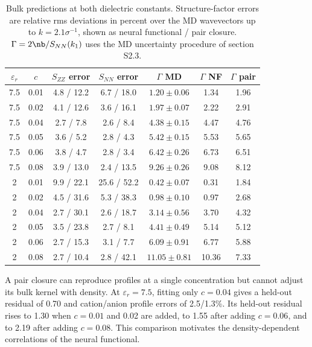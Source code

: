 \begin{table}[H]
\centering
\caption{Bulk predictions at both dielectric constants. Structure-factor errors are relative rms deviations in percent over the MD wavevectors up to $k=2.1\sigma^{-1}$, shown as neural functional / pair closure. $\Gamma=2\nb/S_{NN}(k_1)$ uses the MD uncertainty procedure of section S2.3.}
\label{tab:S:sk}
\begin{tabular}{c c c c c c c}
$\varepsilon_r$ & $c$ & $S_{ZZ}$ error & $S_{NN}$ error & $\Gamma$ MD & $\Gamma$ NF & $\Gamma$ pair\\
\midrule
7.5 & 0.01 & 4.8 / 12.2 & 6.7 / 18.0 & $1.20\pm0.06$ & 1.34 & 1.96\\
7.5 & 0.02 & 4.1 / 12.6 & 3.6 / 16.1 & $1.97\pm0.07$ & 2.22 & 2.91\\
7.5 & 0.04 & 2.7 / 7.8 & 2.6 / 8.4 & $4.38\pm0.15$ & 4.47 & 4.76\\
7.5 & 0.05 & 3.6 / 5.2 & 2.8 / 4.3 & $5.42\pm0.15$ & 5.53 & 5.65\\
7.5 & 0.06 & 3.8 / 4.7 & 2.8 / 3.4 & $6.42\pm0.26$ & 6.73 & 6.51\\
7.5 & 0.08 & 3.9 / 13.0 & 2.4 / 13.5 & $9.26\pm0.26$ & 9.08 & 8.12\\
2 & 0.01 & 9.9 / 22.1 & 25.6 / 52.2 & $0.42\pm0.07$ & 0.31 & 1.84\\
2 & 0.02 & 4.5 / 31.6 & 5.3 / 38.3 & $0.98\pm0.10$ & 0.97 & 2.68\\
2 & 0.04 & 2.7 / 30.1 & 2.6 / 18.7 & $3.14\pm0.56$ & 3.70 & 4.32\\
2 & 0.05 & 3.5 / 23.8 & 2.7 / 8.1 & $4.41\pm0.49$ & 5.14 & 5.12\\
2 & 0.06 & 2.7 / 15.3 & 3.1 / 7.7 & $6.09\pm0.91$ & 6.77 & 5.88\\
2 & 0.08 & 2.7 / 10.4 & 2.8 / 42.1 & $11.05\pm0.81$ & 10.36 & 7.33\\
\bottomrule
\end{tabular}
\end{table}


A pair closure can reproduce profiles at a single concentration but cannot adjust its bulk kernel with density. At $\varepsilon_r=7.5$, fitting only $c=0.04$ gives a held-out residual of 0.70 and cation/anion profile errors of 2.5/1.3\%. Its held-out residual rises to 1.30 when $c=0.01$ and 0.02 are added, to 1.55 after adding $c=0.06$, and to 2.19 after adding $c=0.08$. This comparison motivates the density-dependent correlations of the neural functional.


